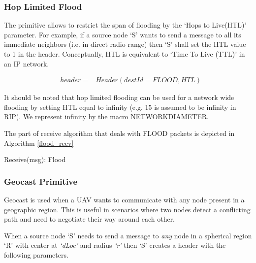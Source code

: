 \subsubsection{Hop Limited Flood}

The primitive allows to restrict the span of flooding by the `Hops to Live(HTL)' parameter. For example, if a source node `S' wants to send a message to all its immediate neighbors (i.e. in direct radio range) then `S' shall set the HTL value to 1 in the header. Conceptually, HTL is equivalent to `Time To Live (TTL)' in an IP network. 

\begin{eqnarray*}
& header = &Header(destId = FLOOD, HTL)
\end{eqnarray*} 

It should be noted that hop limited flooding can be used for a network wide flooding by setting HTL equal to infinity (e.g. 15 is assumed to be infinity in RIP). We represent infinity by the macro NETWORK\textunderscore DIAMETER.

The part of receive algorithm that deals with FLOOD packets is depicted in Algorithm \ref{flood_recv}

\begin{algorithm}
\caption{Receive(msg): Flood} 
\label{flood_recv}
\DontPrintSemicolon
{}

\end{algorithm}

\subsubsection{Geocast Primitive}

Geocast is used when a UAV wants to communicate with any node present in a geographic region. This is useful in scenarios where two nodes detect a conflicting path and need to negotiate their way around each other.  

When a source node `S' needs to send a message to \emph{any} node in a spherical region `R' with center at \emph{`dLoc'} and radius \emph{`r'} then `S' creates a header with the following parameters.

